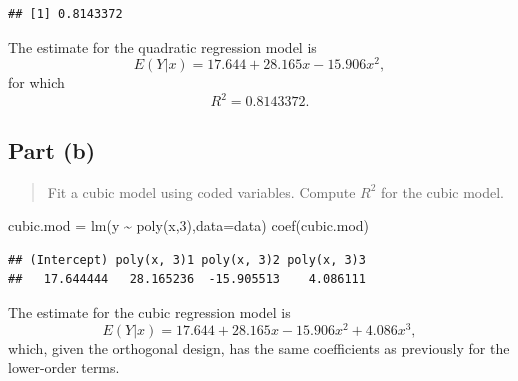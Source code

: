 \documentclass[
]{article}
\newenvironment{Shaded}{\begin{snugshade}}{\end{snugshade}}
\newcommand{\AttributeTok}[1]{\textcolor[rgb]{0.77,0.63,0.00}{#1}}
\newcommand{\DecValTok}[1]{\textcolor[rgb]{0.00,0.00,0.81}{#1}}
\newcommand{\FunctionTok}[1]{\textcolor[rgb]{0.00,0.00,0.00}{#1}}
\newcommand{\NormalTok}[1]{#1}
\newcommand{\OtherTok}[1]{\textcolor[rgb]{0.56,0.35,0.01}{#1}}
\newcommand{\SpecialCharTok}[1]{\textcolor[rgb]{0.00,0.00,0.00}{#1}}
\begin{document}
\begin{Shaded}
\end{Shaded}

\begin{verbatim}
## [1] 0.8143372
\end{verbatim}

The estimate for the quadratic regression model is \[
  E(Y|x) = 17.644 + 28.165 x - 15.906 x^2,
\] for which \[
  R^2 = 0.8143372.
\]

\hypertarget{part-b-1}{%
\subsection{Part (b)}\label{part-b-1}}

\begin{quote}
Fit a cubic model using coded variables. Compute \(R^2\) for the cubic
model.
\end{quote}

\begin{Shaded}
\begin{Highlighting}[]
\NormalTok{cubic.mod }\OtherTok{=} \FunctionTok{lm}\NormalTok{(y }\SpecialCharTok{\textasciitilde{}} \FunctionTok{poly}\NormalTok{(x,}\DecValTok{3}\NormalTok{),}\AttributeTok{data=}\NormalTok{data)}
\FunctionTok{coef}\NormalTok{(cubic.mod)}
\end{Highlighting}
\end{Shaded}

\begin{verbatim}
## (Intercept) poly(x, 3)1 poly(x, 3)2 poly(x, 3)3 
##   17.644444   28.165236  -15.905513    4.086111
\end{verbatim}

\begin{Shaded}
\end{Shaded}

The estimate for the cubic regression model is \[
  E(Y|x) = 17.644 + 28.165 x - 15.906 x^2 + 4.086 x^3,
\] which, given the orthogonal design, has the same coefficients as
previously for the lower-order terms.
\end{document}
